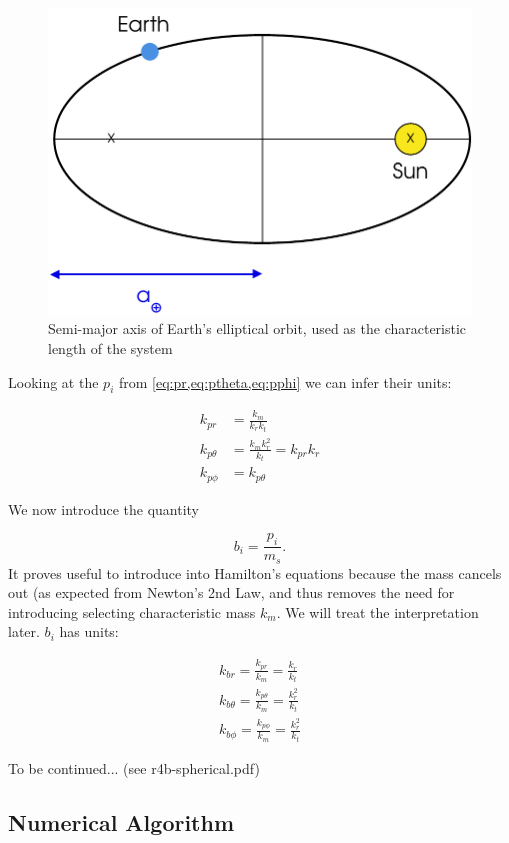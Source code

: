 \begin{figure}[ht]
    \centering
    \includegraphics[width=0.60\linewidth]{fig/earth-semi-major-axis}
    \caption{Semi-major axis of Earth's elliptical orbit, used as the characteristic length of the system}
    \label{fig:earth-semi-major-axis}
\end{figure}

Looking at the \(p_i\) from \cref{eq:pr,eq:ptheta,eq:pphi} we can infer their units:

\begin{align}
    k_{pr} &= \frac{k_m}{k_r k_t} \\[0.2cm]
    k_{p\theta} &= \frac{k_m k_r^2}{k_t} = k_{pr} k_r \\[0.2cm]
    k_{p\phi} &= k_{p\theta}
\end{align}

We now introduce the quantity

\begin{equation}
    b_i = \frac{p_i}{m_s}.
\end{equation}
It proves useful to introduce into Hamilton's equations because the mass cancels out (as expected from Newton's 2nd Law, and thus removes the need for introducing  selecting characteristic mass \(k_m\). We will treat the interpretation later. \(b_i\) has units:

\begin{align}
    k_{br} = \frac{k_{pr}}{k_m} = \frac{k_r}{k_t} \\[0.2cm]
    k_{b\theta} = \frac{k_{p\theta}}{k_m} = \frac{k_r^2}{k_t} \\[0.2cm]
    k_{b\phi} = \frac{k_{p\phi}}{k_m} = \frac{k_r^2}{k_t}
\end{align}

To be continued... (see r4b-spherical.pdf)





\subsection{Numerical Algorithm}

